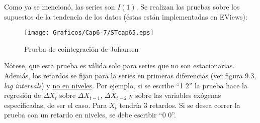 Como ya se mencion\'{o}, las series son $I(1)$. Se realizan las pruebas sobre los supuestos de la tendencia de los datos (\'{e}stas est\'{a}n implementadas en EViews):

\begin{figure}[H]
\texttt{[image: Graficos/Cap6-7/STcap65.eps]}
\caption{Prueba de cointegraci\'{o}n de Johansen}
\label{fig5}
\end{figure}


N\'{o}tese, que esta prueba es v\'{a}lida solo para series que no son estacionarias. Adem\'{a}s, los retardos se fijan para la series en primeras diferencias (ver figura 9.3, \textit{lag intervals}) y \underline {no en niveles}. Por ejemplo, si se escribe ``1 2'' la prueba hace la regresi\'{o}n de $\Delta X_{t}$ sobre $\Delta X_{t-1}$, $\Delta X_{t-2}$ y sobre las variables ex\'{o}genas especificadas, de ser el caso. Para $X_{t}$ tendr\'{i}a 3 retardos. Si se desea correr la prueba con un retardo en niveles, se debe escribir ``0 0''. 
% 
% 
